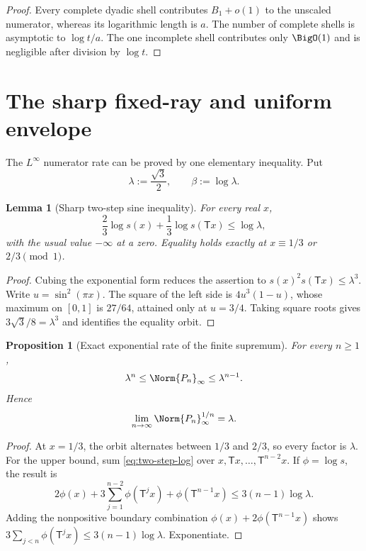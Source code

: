 \documentclass[11pt,oneside]{article}
\newtheorem{proposition}[theorem]{Proposition}
\newtheorem{lemma}[theorem]{Lemma}
\theoremstyle{definition}
\theoremstyle{remark}
\newcommand{\T}{\mathsf T}
\begin{document}
\begin{proof}
Every complete dyadic shell contributes $B_1+o(1)$ to the unscaled numerator,
whereas its logarithmic length is $a$.  The number of complete shells is
asymptotic to $\log t/a$.  The one incomplete shell contributes only
$\BigO(1)$ and is negligible after division by $\log t$.
\end{proof}

\section{The sharp fixed-ray and uniform envelope}
\label{sec:extremal}

The $L^\infty$ numerator rate can be proved by one elementary inequality.  Put
\begin{equation}
 \lambda:=\frac{\sqrt3}{2},
 \qquad
 \beta:=\log\lambda.
 \label{eq:lambda-beta}
\end{equation}

\begin{lemma}[Sharp two-step sine inequality]
\label{lem:two-step}
For every real $x$,
\begin{equation}
 \frac23\log s(x)+\frac13\log s(\T x)
 \le\log\lambda,
 \label{eq:two-step-log}
\end{equation}
with the usual value $-\infty$ at a zero.  Equality holds exactly at
$x\equiv1/3$ or $2/3\pmod1$.
\end{lemma}

\begin{proof}
Cubing the exponential form reduces the assertion to
$s(x)^2s(\T x)\le\lambda^3$.  Write
$u=\sin^2(\pi x)$.  The square of the left side is
$4u^3(1-u)$, whose maximum on $[0,1]$ is $27/64$, attained only at
$u=3/4$.  Taking square roots gives
$3\sqrt3/8=\lambda^3$ and identifies the equality orbit.
\end{proof}

\begin{proposition}[Exact exponential rate of the finite supremum]
\label{prop:Pn-sup}
For every $n\ge1$,
\begin{equation}
 \lambda^n\le\Norm{P_n}_\infty\le\lambda^{n-1}.
 \label{eq:Pn-sup}
\end{equation}
Hence
\begin{equation}
 \lim_{n\to\infty}\Norm{P_n}_\infty^{1/n}=\lambda.
 \label{eq:Gelfond-rate}
\end{equation}
\end{proposition}

\begin{proof}
At $x=1/3$, the orbit alternates between $1/3$ and $2/3$, so every factor is
$\lambda$.  For the upper bound, sum \eqref{eq:two-step-log} over
$x,\T x,\ldots,\T^{n-2}x$.  If $\phi=\log s$, the result is
\[
 2\phi(x)+3\sum_{j=1}^{n-2}\phi(\T^jx)
 +\phi(\T^{n-1}x)\le3(n-1)\log\lambda.
\]
Adding the nonpositive boundary combination
$\phi(x)+2\phi(\T^{n-1}x)$ shows
$3\sum_{j<n}\phi(\T^jx)\le3(n-1)\log\lambda$.
Exponentiate.
\end{proof}
\end{document}
